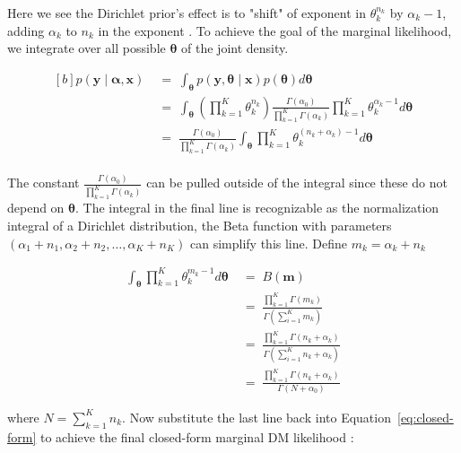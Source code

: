 Here we see the Dirichlet prior's effect is to "shift" of exponent in \(\theta_k^{n_k}\) by \(\alpha_k-1\), adding \(\alpha_k\) to \(n_k\) in the exponent \parencite{mimno_polya}. To achieve the goal of the marginal likelihood, we integrate over all possible \(\boldsymbol{\theta}\) of the joint density.

\begin{equation}
    \label{eq:closed-form}
    \begin{aligned}[b]
        p(\mathbf{y} \mid \boldsymbol{\alpha}, \mathbf{x}) 
    \;&=\;
        \int_{\boldsymbol{\theta}} p(\mathbf{y}, \boldsymbol{\theta} \mid \mathbf{x})
        p(\boldsymbol{\theta})
        d\boldsymbol{\theta}\\
    \;&=\;
        \int_{\boldsymbol{\theta}} 
        \left( \prod_{k=1}^K \theta_k^{n_k}\right)
        \frac{\Gamma(\alpha_0)}{\prod_{k=1}^K \Gamma(\alpha_k)} \prod_{k=1}^K \theta_k^{\alpha_k-1} d\boldsymbol{\theta}\\
    \;&=\;
        \frac{\Gamma(\alpha_0)}{\prod_{k=1}^K \Gamma(\alpha_k)} 
        \int_{\boldsymbol{\theta}} \prod_{k=1}^K \theta_k^{(n_k + \alpha_k) -1} d\boldsymbol{\theta}\\
    \end{aligned}   
\end{equation}

The constant \(\frac{\Gamma(\alpha_0)}{\prod_{k=1}^K \Gamma(\alpha_k)}\) can be pulled outside of the integral since these do not depend on \(\boldsymbol{\theta}\). The integral in the final line is recognizable as the normalization integral of a Dirichlet distribution, the Beta function with parameters \((\alpha_1 + n_1, \alpha_2 + n_2, \dots, \alpha_K + n_K)\) can simplify this line. Define \(m_k = \alpha_k + n_k\)

\begin{align*}
        \int_{\boldsymbol{\theta}} \prod_{k=1}^K \theta_k^{m_k - 1} d\boldsymbol{\theta}
    \;&=\;
        B(\mathbf{m})\\
    \;&=\;
        \frac{\prod_{k=1}^K \Gamma(m_k)}{\Gamma(\sum_{i=1}^K m_k)}\\
    \;&=\;
        \frac{\prod_{k=1}^K \Gamma(n_k + \alpha_k)}{\Gamma(\sum_{i=1}^K n_k + \alpha_k )} \\
    \;&=\;
        \frac{\prod_{k=1}^K \Gamma(n_k + \alpha_k)}{\Gamma(N + \alpha_0)} 
\end{align*}

where \(N = \sum_{k=1}^K n_k\). Now substitute the last line back into Equation~\ref{eq:closed-form} to achieve the final closed-form marginal DM likelihood \parencite{wiki:dirichlet-multinomial}:

